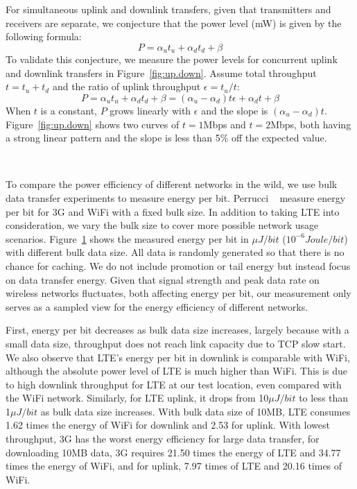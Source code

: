 For simultaneous uplink and downlink transfers, given that transmitters and receivers are separate, we conjecture that the power level (mW) is given by the following formula:
\begin{equation*}
P = \alpha_u t_u + \alpha_d t_d+ \beta
\end{equation*}
To validate this conjecture, we measure the power levels for concurrent uplink and downlink transfers in Figure~\ref{fig:up.down}. Assume total throughput $t = t_u + t_d$ and the ratio of uplink throughput $\epsilon = t_u \big/ t$:
\begin{equation*}
P = \alpha_u t_u + \alpha_d t_d+ \beta = (\alpha_u - \alpha_d)t\epsilon + \alpha_d t + \beta
\end{equation*}
When $t$ is a constant, $P$ grows linearly with $\epsilon$ and the slope is $(\alpha_u - \alpha_d)t$. Figure~\ref{fig:up.down} shows two curves of $t = 1$Mbps and $t = 2$Mbps, both having a strong linear pattern and the slope is less than 5\% off the expected value.


\label{sec:power.bulk}

\begin{figure}[t]
\centering
{} \\
\label{fig:energy.size}
\end{figure}

To compare the power efficiency of different networks in the wild, we use bulk data transfer experiments to measure energy per bit.
Perrucci \etal~\cite{vtc.survey} measure energy per bit for 3G and WiFi with a fixed bulk size. In addition to taking LTE into consideration, we vary the bulk size to cover more possible network usage scenarios. Figure~\ref{fig:energy.size} shows the measured energy per bit in $\mu J / bit$ ($10^{-6} Joule / bit$) with different bulk data size. All data is randomly generated so that there is no chance for caching. We do not include promotion or tail energy but instead focus on data transfer energy. Given that signal strength and peak data rate on wireless networks fluctuates, both affecting energy per bit, our measurement only serves as a sampled view for the energy efficiency of different networks.

First, energy per bit decreases as bulk data size increases, largely because with a small data size, throughput does not reach link capacity due to TCP slow start. We also observe that LTE's energy per bit in downlink is comparable with WiFi, although the absolute power level of LTE is much higher than WiFi. This is due to high downlink throughput for LTE at our test location, even compared with the WiFi network. Similarly, for LTE uplink, it drops from 10$\mu J / bit$ to less than 1$\mu J / bit$ as bulk data size increases. With bulk data size of 10MB, LTE consumes 1.62 times the energy of WiFi for downlink and 2.53 for uplink. With lowest throughput, 3G has the worst energy efficiency for large data transfer, \eg for downloading 10MB data, 3G requires 21.50 times the energy of LTE and 34.77 times the energy of WiFi, and for uplink, 7.97 times of LTE and 20.16 times of WiFi.

